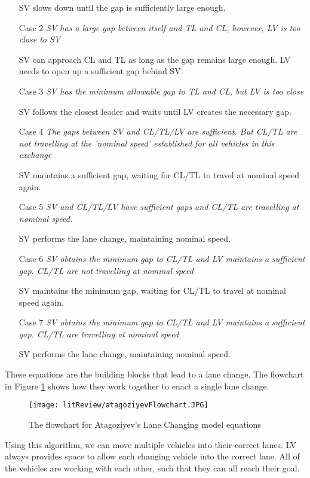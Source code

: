 \begin{appendices}
\begin{enumerate}
SV slows down until the gap is sufficiently large enough.
\item[Case 2] \textit{SV has a large gap between itself and TL and CL, however, LV is too close to SV}

SV can approach CL and TL as long as the gap remains large enough. LV needs to open up a sufficient gap behind SV.
\item[Case 3] \textit{SV has the minimum allowable gap to TL and CL, but LV is too close}

SV follows the closest leader and waits until LV creates the necessary gap.
\item[Case 4] \textit{The gaps between SV and CL/TL/LV are sufficient. But CL/TL are not travelling at the 'nominal speed' established for all vehicles in this exchange}

SV maintains a sufficient gap, waiting for CL/TL to travel at nominal speed again.
\item[Case 5] \textit{SV and CL/TL/LV have sufficient gaps and CL/TL are travelling at nominal speed.}

SV performs the lane change, maintaining nominal speed.
\item[Case 6] \textit{SV obtains the minimum gap to CL/TL and LV maintains a sufficient gap. CL/TL are not travelling at nominal speed}

SV maintains the minimum gap, waiting for CL/TL to travel at nominal speed again.
\item[Case 7] \textit{SV obtains the minimum gap to CL/TL and LV maintains a sufficient gap. CL/TL are travelling at nominal speed}

SV performs the lane change, maintaining nominal speed.
\end{enumerate}

These equations are the building blocks that lead to a lane change. The flowchart in Figure \ref{fig:AtogoziyevFlowchart} shows how they work together to enact a single lane change.

\begin{figure}[htb]
\texttt{[image: litReview/atagoziyevFlowchart.JPG]}
\caption{The flowchart for Atagoziyev's Lane Changing model equations}
\label{fig:AtogoziyevFlowchart}
\end{figure}

Using this algorithm, we can move multiple vehicles into their correct lanes. LV always provides space to allow each changing vehicle into the correct lane. All of the vehicles are working with each other, such that they can all reach their goal.


\end{appendices}
